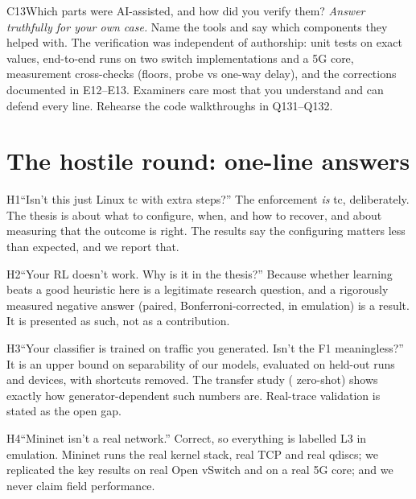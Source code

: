 \begin{qa}{C13}{Which parts were AI-assisted, and how did you verify them?}
\textit{Answer truthfully for your own case.} Name the tools and say which components they helped with. The
verification was independent of authorship: unit tests on exact values, end-to-end runs on two switch implementations
and a 5G core, measurement cross-checks (floors, probe vs one-way delay), and the corrections documented in E12--E13.
Examiners care most that you understand and can defend every line. Rehearse the code walkthroughs in Q131--Q132.
\end{qa}

\section{The hostile round: one-line answers}

\begin{qa}{H1}{``Isn't this just Linux tc with extra steps?''}
The enforcement \emph{is} tc, deliberately. The thesis is about what to configure, when, and how to recover, and about
measuring that the outcome is right. The results say the configuring matters less than expected, and we report that.
\end{qa}

\begin{qa}{H2}{``Your RL doesn't work. Why is it in the thesis?''}
Because whether learning beats a good heuristic here is a legitimate research question, and a rigorously measured
negative answer (paired, Bonferroni-corrected, in emulation) is a result. It is presented as such, not as a
contribution.
\end{qa}

\begin{qa}{H3}{``Your classifier is trained on traffic you generated. Isn't the F1 meaningless?''}
It is an upper bound on separability of our models, evaluated on held-out runs and devices, with shortcuts removed.
The transfer study (\NTrZero{} zero-shot) shows exactly how generator-dependent such numbers are. Real-trace validation is
stated as the open gap.
\end{qa}

\begin{qa}{H4}{``Mininet isn't a real network.''}
Correct, so everything is labelled L3 in emulation. Mininet runs the real kernel stack, real TCP and real qdiscs; we
replicated the key results on real Open vSwitch and on a real 5G core; and we never claim field performance.
\end{qa}


